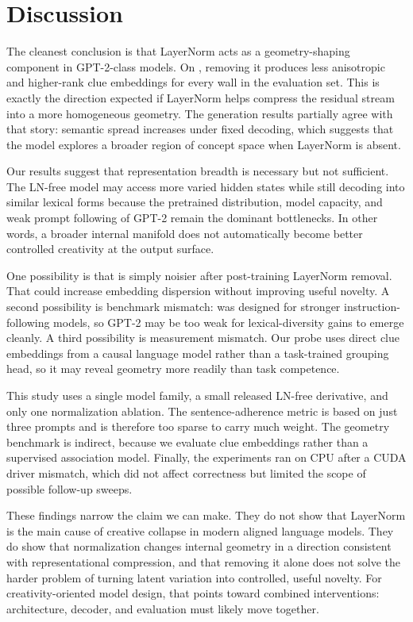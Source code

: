 \section{Discussion}
\label{sec:discussion}

 The cleanest conclusion is that LayerNorm acts as a geometry-shaping component in GPT-2-class models. On \ocw, removing it produces less anisotropic and higher-rank clue embeddings for every wall in the evaluation set. This is exactly the direction expected if LayerNorm helps compress the residual stream into a more homogeneous geometry. The generation results partially agree with that story: semantic spread increases under fixed decoding, which suggests that the model explores a broader region of concept space when LayerNorm is absent.

 Our results suggest that representation breadth is necessary but not sufficient. The LN-free model may access more varied hidden states while still decoding into similar lexical forms because the pretrained distribution, model capacity, and weak prompt following of GPT-2 remain the dominant bottlenecks. In other words, a broader internal manifold does not automatically become better controlled creativity at the output surface.

 One possibility is that \lnfreegpt is simply noisier after post-training LayerNorm removal. That could increase embedding dispersion without improving useful novelty. A second possibility is benchmark mismatch: \noveltybench was designed for stronger instruction-following models, so GPT-2 may be too weak for lexical-diversity gains to emerge cleanly. A third possibility is measurement mismatch. Our \ocw probe uses direct clue embeddings from a causal language model rather than a task-trained grouping head, so it may reveal geometry more readily than task competence.

 This study uses a single model family, a small released LN-free derivative, and only one normalization ablation. The sentence-adherence metric is based on just three prompts and is therefore too sparse to carry much weight. The geometry benchmark is indirect, because we evaluate clue embeddings rather than a supervised association model. Finally, the experiments ran on CPU after a CUDA driver mismatch, which did not affect correctness but limited the scope of possible follow-up sweeps.

 These findings narrow the claim we can make. They do not show that LayerNorm is the main cause of creative collapse in modern aligned language models. They do show that normalization changes internal geometry in a direction consistent with representational compression, and that removing it alone does not solve the harder problem of turning latent variation into controlled, useful novelty. For creativity-oriented model design, that points toward combined interventions: architecture, decoder, and evaluation must likely move together.
